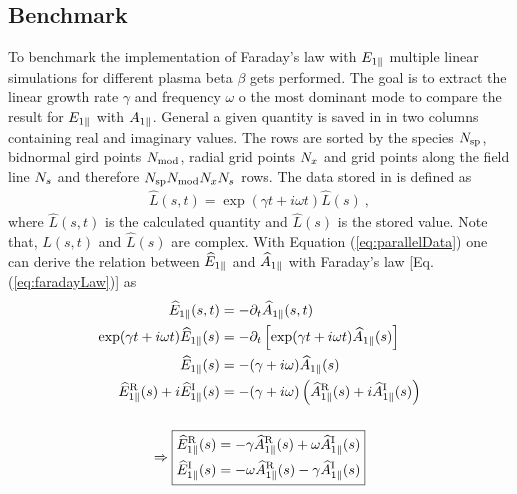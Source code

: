 \newpage

\subsection{Benchmark}
\label{sub:benchmarkFieldEpar}

To benchmark the implementation of Faraday's law with $E_{1\parallel}$ multiple linear simulations for different plasma beta $\beta$ gets performed. The goal is to extract the linear growth rate $\gamma$ and frequency $\omega$ o the most dominant mode to compare the result for $E_{1\parallel}$ with $A_{1\parallel}$. General a given quantity is saved in  in two columns containing real and imaginary values. The rows are sorted by the species $N_\mathrm{sp}$, bidnormal gird points $N_\mathrm{mod}$, radial grid points $N_x$ and grid points along the field line $N_s$ and therefore $N_\mathrm{sp}N_\mathrm{mod}N_xN_s$ rows. The data stored in  is defined as
\begin{gather}
    \widehat{L}(s,t) = \exp (\gamma t + i\omega t) \widehat{L}(s)~,
    \label{eq:parallelData}
\end{gather}
where $\widehat{L}(s,t)$ is the calculated quantity and $\widehat{L}(s)$ is the stored value. \cite{GKWManual} Note that, $\widehat{L}(s,t)$ and $\widehat{L}(s)$ are complex. With Equation (\ref{eq:parallelData}) one can derive the relation between $\widehat{E}_{1\parallel}$ and $\widehat{A}_{1\parallel}$ with Faraday's law [Eq. (\ref{eq:faradayLaw})] as
\begin{gather}
    \begin{aligned}
        \widehat{E}_{1\parallel}(s,t) &= - \partial_t \widehat{A}_{1\parallel}(s,t) \\
        \exp (\gamma t + i\omega t) \widehat{E}_{1\parallel}(s) &= - \partial_t \left[\exp(\gamma t + i\omega t) \widehat{A}_{1\parallel}(s)\right] \\
        \widehat{E}_{1\parallel}(s) &= - (\gamma + i\omega) \widehat{A}_{1\parallel}(s) \\
        \widehat{E}_{1\parallel}^\mathrm{R}(s) + i \widehat{E}_{1\parallel}^\mathrm{I}(s) &= - (\gamma + i\omega) \left(\widehat{A}_{1\parallel}^\mathrm{R}(s) + i \widehat{A}_{1\parallel}^\mathrm{I}(s)\right)
    \end{aligned} \\[0.5cm] 
    \Rightarrow \boxed{
    \begin{aligned}
        \widehat{E}_{1\parallel}^\mathrm{R}(s) &= - \gamma \widehat{A}_{1\parallel}^\mathrm{R}(s) + \omega \widehat{A}_{1\parallel}^\mathrm{I}(s) \\ 
        \widehat{E}_{1\parallel}^\mathrm{I}(s) &= - \omega \widehat{A}_{1\parallel}^\mathrm{R}(s) - \gamma \widehat{A}_{1\parallel}^\mathrm{I}(s)   
    \end{aligned}
    } \nonumber
    \label{eq:parallelDataEparEqApar}
\end{gather}

